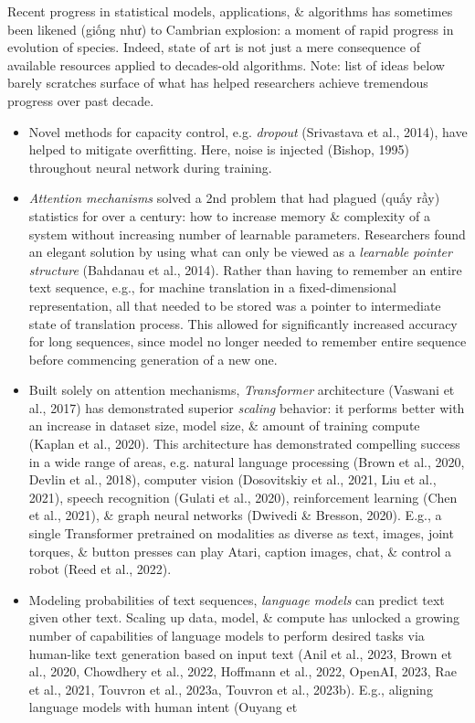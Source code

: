 \documentclass{article}
\begin{document}
\begin{enumerate}
\begin{itemize}
\begin{itemize}
			Recent progress in statistical models, applications, \& algorithms has sometimes been likened (giống như) to Cambrian explosion: a moment of rapid progress in evolution of species. Indeed, state of art is not just a mere consequence of available resources applied to decades-old algorithms. Note: list of ideas below barely scratches surface of what has helped researchers achieve tremendous progress over past decade.
			\begin{itemize}
				\item Novel methods for capacity control, e.g. {\it dropout} (Srivastava et al., 2014), have helped to mitigate overfitting. Here, noise is injected (Bishop, 1995) throughout neural network during training.
				\item {\it Attention mechanisms} solved a 2nd problem that had plagued (quấy rầy) statistics for over a century: how to increase memory \& complexity of a system without increasing number of learnable parameters. Researchers found an elegant solution by using what can only be viewed as a {\it learnable pointer structure} (Bahdanau et al., 2014). Rather than having to remember an entire text sequence, e.g., for machine translation in a fixed-dimensional representation, all that needed to be stored was a pointer to intermediate state of translation process. This allowed for significantly increased accuracy for long sequences, since model no longer needed to remember entire sequence before commencing generation of a new one.
				\item Built solely on attention mechanisms, {\it Transformer} architecture (Vaswani et al., 2017) has demonstrated superior {\it scaling} behavior: it performs better with an increase in dataset size, model size, \& amount of training compute (Kaplan et al., 2020). This architecture has demonstrated compelling success in a wide range of areas, e.g. natural language processing (Brown et al., 2020, Devlin et al., 2018), computer vision (Dosovitskiy et al., 2021, Liu et al., 2021), speech recognition (Gulati et al., 2020), reinforcement learning (Chen et al., 2021), \& graph neural networks (Dwivedi \& Bresson, 2020). E.g., a single Transformer pretrained on modalities as diverse as text, images, joint torques, \& button presses can play Atari, caption images, chat, \& control a robot (Reed et al., 2022).
				\item Modeling probabilities of text sequences, {\it language models} can predict text given other text. Scaling up data, model, \& compute has unlocked a growing number of capabilities of language models to perform desired tasks via human-like text generation based on input text (Anil et al., 2023, Brown et al., 2020, Chowdhery et al., 2022, Hoffmann et al., 2022, OpenAI, 2023, Rae et al., 2021, Touvron et al., 2023a, Touvron et al., 2023b). E.g., aligning language models with human intent (Ouyang et

\end{itemize}
\end{itemize}
\end{itemize}
\end{enumerate}
\end{document}

